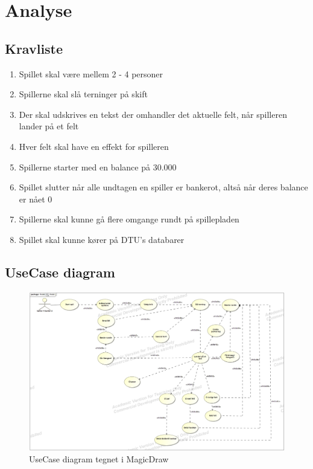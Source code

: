 \section{Analyse}
        
    
    \subsection{Kravliste}
        \begin{enumerate}
            \item Spillet skal være mellem 2 - 4 personer
            \item Spillerne skal slå terninger på skift
            \item Der skal udskrives en tekst der omhandler det aktuelle felt, når spilleren lander på et felt
            \item Hver felt skal have en effekt for spilleren
            \item Spillerne starter med en balance på 30.000
            \item Spillet slutter når alle undtagen en spiller er bankerot, altså når deres balance er nået 0
            \item Spillerne skal kunne gå flere omgange rundt på spillepladen
            \item Spillet skal kunne kører på DTU’s databarer
        \end{enumerate}



\pagebreak
\subsection{UseCase diagram}
    \begin{figure}[h]
        \advance\leftskip-3cm
        \includegraphics[width=20cm]{fig/UC-cdio3.jpg}
        \caption{UseCase diagram tegnet i MagicDraw}
    \end{figure}

